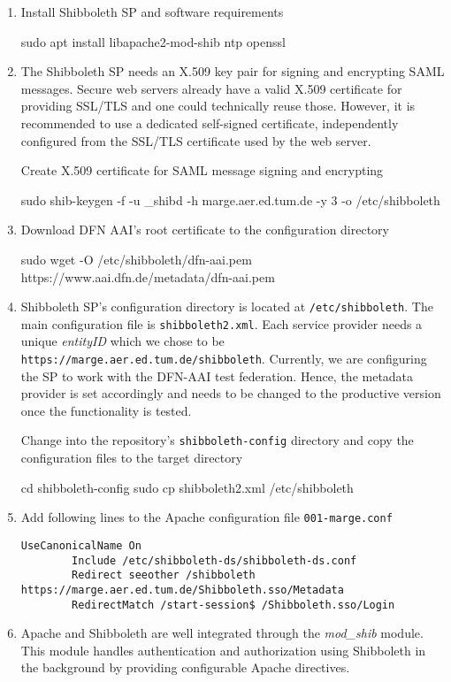 \begin{enumerate}
    \item Install Shibboleth SP and software requirements
    \begin{terminal}
        sudo apt install libapache2-mod-shib ntp openssl
    \end{terminal}
    \item The Shibboleth SP needs an X.509 key pair for signing and encrypting
    SAML messages. Secure web servers already have a valid X.509 certificate for
    providing SSL/TLS and one could technically reuse those. However, it is
    recommended to use a dedicated self-signed certificate, independently
    configured from the SSL/TLS certificate used by the web server.
    
    Create X.509 certificate for SAML message signing and encrypting
    \begin{terminal}
        sudo shib-keygen -f -u _shibd -h marge.aer.ed.tum.de -y 3 -o /etc/shibboleth
    \end{terminal}
    \item Download DFN AAI's root certificate to the configuration directory
    \begin{terminal}
        sudo wget -O /etc/shibboleth/dfn-aai.pem https://www.aai.dfn.de/metadata/dfn-aai.pem
    \end{terminal}
    \item Shibboleth SP's configuration directory is located at
    \texttt{/etc/shibboleth}. The main configuration file is
    \texttt{shibboleth2.xml}. Each service provider needs a unique
    \textit{entityID} which we chose to be
    \texttt{https://marge.aer.ed.tum.de/shibboleth}. Currently, we are
    configuring the SP to work with the DFN-AAI test federation. Hence, the
    metadata provider is set accordingly and needs to be changed to the
    productive version once the functionality is tested. 
    
    Change into the repository's \texttt{shibboleth-config} directory and
    copy the configuration files to the target directory
    \begin{terminal}
        cd shibboleth-config
        sudo cp shibboleth2.xml /etc/shibboleth
    \end{terminal}
    \item Add following lines to the Apache configuration file
    \texttt{001-marge.conf}
    \begin{lstlisting}[frame={l}]
        UseCanonicalName On
        Include /etc/shibboleth-ds/shibboleth-ds.conf
        Redirect seeother /shibboleth https://marge.aer.ed.tum.de/Shibboleth.sso/Metadata
        RedirectMatch /start-session$ /Shibboleth.sso/Login
    \end{lstlisting}
    \item Apache and Shibboleth are well integrated through the
    \textit{mod\_shib} module. This module handles authentication and
    authorization using Shibboleth in the background by providing configurable
    Apache directives.
    

\end{enumerate}
